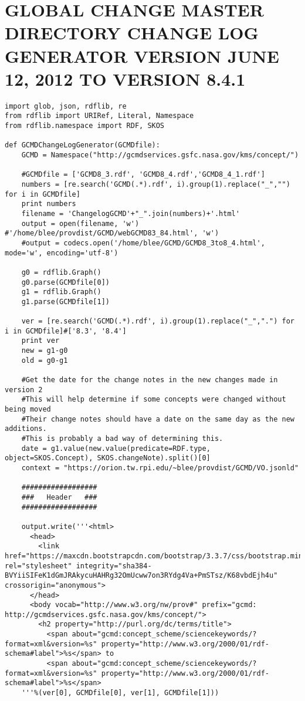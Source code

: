 \chapter{GLOBAL CHANGE MASTER DIRECTORY CHANGE LOG GENERATOR VERSION JUNE 12, 2012 TO VERSION 8.4.1} \label{app:gcmd}
\begin{verbatim}
import glob, json, rdflib, re
from rdflib import URIRef, Literal, Namespace
from rdflib.namespace import RDF, SKOS

def GCMDChangeLogGenerator(GCMDfile):
	GCMD = Namespace("http://gcmdservices.gsfc.nasa.gov/kms/concept/")
	
	#GCMDfile = ['GCMD8_3.rdf', 'GCMD8_4.rdf','GCMD8_4_1.rdf']
	numbers = [re.search('GCMD(.*).rdf', i).group(1).replace("_","") for i in GCMDfile]
	print numbers
	filename = 'ChangelogGCMD'+"_".join(numbers)+'.html'
	output = open(filename, 'w') #'/home/blee/provdist/GCMD/webGCMD83_84.html', 'w')
	#output = codecs.open('/home/blee/GCMD/GCMD8_3to8_4.html', mode='w', encoding='utf-8')
	
	g0 = rdflib.Graph()
	g0.parse(GCMDfile[0])
	g1 = rdflib.Graph()
	g1.parse(GCMDfile[1])
	
	ver = [re.search('GCMD(.*).rdf', i).group(1).replace("_",".") for i in GCMDfile]#['8.3', '8.4']
	print ver
	new = g1-g0
	old = g0-g1
	
	#Get the date for the change notes in the new changes made in version 2
	#This will help determine if some concepts were changed without being moved
	#Their change notes should have a date on the same day as the new additions.
	#This is probably a bad way of determining this.
	date = g1.value(new.value(predicate=RDF.type, object=SKOS.Concept), SKOS.changeNote).split()[0]
	context = "https://orion.tw.rpi.edu/~blee/provdist/GCMD/VO.jsonld"
	
	##################
	###   Header   ###
	##################
	
	output.write('''<html>
	  <head>
	    <link href="https://maxcdn.bootstrapcdn.com/bootstrap/3.3.7/css/bootstrap.min.css" rel="stylesheet" integrity="sha384-BVYiiSIFeK1dGmJRAkycuHAHRg32OmUcww7on3RYdg4Va+PmSTsz/K68vbdEjh4u" crossorigin="anonymous">
	  </head>
	  <body vocab="http://www.w3.org/nw/prov#" prefix="gcmd: http://gcmdservices.gsfc.nasa.gov/kms/concept/">
	    <h2 property="http://purl.org/dc/terms/title">
	      <span about="gcmd:concept_scheme/sciencekeywords/?format=xml&version=%s" property="http://www.w3.org/2000/01/rdf-schema#label">%s</span> to 
	      <span about="gcmd:concept_scheme/sciencekeywords/?format=xml&version=%s" property="http://www.w3.org/2000/01/rdf-schema#label">%s</span>
	'''%(ver[0], GCMDfile[0], ver[1], GCMDfile[1]))
	

\end{verbatim}
